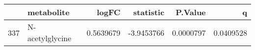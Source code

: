 \begin{tabular}{llrrrr}
\toprule
{} &       metabolite &     logFC &  statistic &   P.Value &         q \\
\midrule
337 &  N-acetylglycine & 0.5639679 & -3.9453766 & 0.0000797 & 0.0409528 \\
\bottomrule
\end{tabular}
